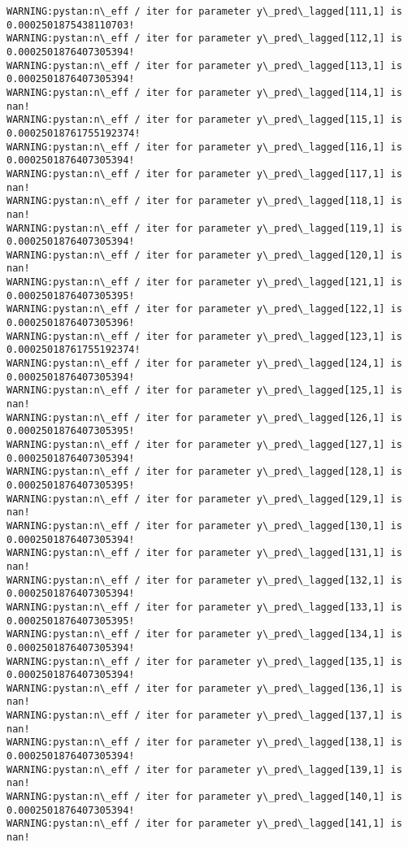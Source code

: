 \documentclass[11pt]{article}
\begin{document}
\begin{Verbatim}[commandchars=\\\{\}]
WARNING:pystan:n\_eff / iter for parameter y\_pred\_lagged[111,1] is 0.0002501875438110703!
WARNING:pystan:n\_eff / iter for parameter y\_pred\_lagged[112,1] is 0.0002501876407305394!
WARNING:pystan:n\_eff / iter for parameter y\_pred\_lagged[113,1] is 0.0002501876407305394!
WARNING:pystan:n\_eff / iter for parameter y\_pred\_lagged[114,1] is nan!
WARNING:pystan:n\_eff / iter for parameter y\_pred\_lagged[115,1] is 0.00025018761755192374!
WARNING:pystan:n\_eff / iter for parameter y\_pred\_lagged[116,1] is 0.0002501876407305394!
WARNING:pystan:n\_eff / iter for parameter y\_pred\_lagged[117,1] is nan!
WARNING:pystan:n\_eff / iter for parameter y\_pred\_lagged[118,1] is nan!
WARNING:pystan:n\_eff / iter for parameter y\_pred\_lagged[119,1] is 0.0002501876407305394!
WARNING:pystan:n\_eff / iter for parameter y\_pred\_lagged[120,1] is nan!
WARNING:pystan:n\_eff / iter for parameter y\_pred\_lagged[121,1] is 0.0002501876407305395!
WARNING:pystan:n\_eff / iter for parameter y\_pred\_lagged[122,1] is 0.0002501876407305396!
WARNING:pystan:n\_eff / iter for parameter y\_pred\_lagged[123,1] is 0.00025018761755192374!
WARNING:pystan:n\_eff / iter for parameter y\_pred\_lagged[124,1] is 0.0002501876407305394!
WARNING:pystan:n\_eff / iter for parameter y\_pred\_lagged[125,1] is nan!
WARNING:pystan:n\_eff / iter for parameter y\_pred\_lagged[126,1] is 0.0002501876407305395!
WARNING:pystan:n\_eff / iter for parameter y\_pred\_lagged[127,1] is 0.0002501876407305394!
WARNING:pystan:n\_eff / iter for parameter y\_pred\_lagged[128,1] is 0.0002501876407305395!
WARNING:pystan:n\_eff / iter for parameter y\_pred\_lagged[129,1] is nan!
WARNING:pystan:n\_eff / iter for parameter y\_pred\_lagged[130,1] is 0.0002501876407305394!
WARNING:pystan:n\_eff / iter for parameter y\_pred\_lagged[131,1] is nan!
WARNING:pystan:n\_eff / iter for parameter y\_pred\_lagged[132,1] is 0.0002501876407305394!
WARNING:pystan:n\_eff / iter for parameter y\_pred\_lagged[133,1] is 0.0002501876407305395!
WARNING:pystan:n\_eff / iter for parameter y\_pred\_lagged[134,1] is 0.0002501876407305394!
WARNING:pystan:n\_eff / iter for parameter y\_pred\_lagged[135,1] is 0.0002501876407305394!
WARNING:pystan:n\_eff / iter for parameter y\_pred\_lagged[136,1] is nan!
WARNING:pystan:n\_eff / iter for parameter y\_pred\_lagged[137,1] is nan!
WARNING:pystan:n\_eff / iter for parameter y\_pred\_lagged[138,1] is 0.0002501876407305394!
WARNING:pystan:n\_eff / iter for parameter y\_pred\_lagged[139,1] is nan!
WARNING:pystan:n\_eff / iter for parameter y\_pred\_lagged[140,1] is 0.0002501876407305394!
WARNING:pystan:n\_eff / iter for parameter y\_pred\_lagged[141,1] is nan!

\end{Verbatim}
\end{document}
